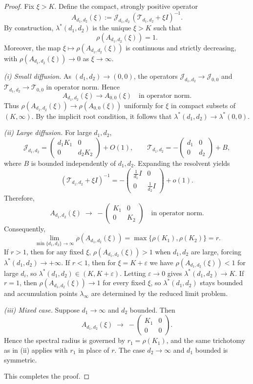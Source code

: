 \documentclass[a4paper,11pt]{amsart}
\theoremstyle{definition}
\let\0=\emptyset
\numberwithin{equation}{section}
\theoremstyle{definition}
\let\0=\emptyset
\begin{document}
\begin{proof}
Fix $\xi>K$. Define the compact, strongly positive operator
\[
A_{d_1,d_2}(\xi):=\mathscr{J}_{d_1,d_2}\,(\mathscr{T}_{d_1,d_2}+\xi I)^{-1}.
\]
By construction, $\lambda^\ast(d_1,d_2)$ is the unique $\xi>K$ such that
\[
\rho(A_{d_1,d_2}(\xi))=1.
\]
Moreover, the map $\xi\mapsto \rho(A_{d_1,d_2}(\xi))$ is continuous and strictly decreasing, with
\(\rho(A_{d_1,d_2}(\xi))\to 0\) as $\xi\to\infty$.

\smallskip\noindent
\emph{(i) Small diffusion.}
As $(d_1,d_2)\to(0,0)$, the operators $\mathscr{J}_{d_1,d_2}\to\mathscr{J}_{0,0}$ and
$\mathscr{T}_{d_1,d_2}\to\mathscr{T}_{0,0}$ in operator norm. Hence
\[
A_{d_1,d_2}(\xi)\to A_{0,0}(\xi) \quad \text{in operator norm.}
\]
Thus $\rho(A_{d_1,d_2}(\xi))\to\rho(A_{0,0}(\xi))$ uniformly for $\xi$ in compact subsets of $(K,\infty)$.
By the implicit root condition, it follows that
\(\lambda^\ast(d_1,d_2)\to\lambda^\ast(0,0)\).

\smallskip\noindent
\emph{(ii) Large diffusion.}
For large $d_1,d_2$,
\[
\mathscr{J}_{d_1,d_2}=\begin{pmatrix}d_1 K_1&0\\0&d_2 K_2\end{pmatrix}+O(1),
\qquad
\mathscr{T}_{d_1,d_2}=-\begin{pmatrix}d_1&0\\0&d_2\end{pmatrix}+B,
\]
where $B$ is bounded independently of $d_1,d_2$. Expanding the resolvent yields
\[
(\mathscr{T}_{d_1,d_2}+\xi I)^{-1}
= -\begin{pmatrix}\tfrac{1}{d_1}I & 0\\ 0 & \tfrac{1}{d_2}I\end{pmatrix}+o(1).
\]
Therefore,
\[
A_{d_1,d_2}(\xi)\;\longrightarrow\; -\begin{pmatrix}K_1&0\\0&K_2\end{pmatrix}
\quad\text{in operator norm.}
\]
Consequently,
\[
\lim_{\min\{d_1,d_2\}\to\infty}\rho(A_{d_1,d_2}(\xi))=\max\{\rho(K_1),\rho(K_2)\}=r.
\]
If $r>1$, then for any fixed $\xi$, $\rho(A_{d_1,d_2}(\xi))>1$ when $d_1,d_2$ are large, forcing
$\lambda^\ast(d_1,d_2)\to+\infty$.
If $r<1$, then for $\xi=K+\varepsilon$ we have $\rho(A_{d_1,d_2}(\xi))<1$ for large $d_i$, so
$\lambda^\ast(d_1,d_2)\in(K,K+\varepsilon)$. Letting $\varepsilon\to0$ gives $\lambda^\ast(d_1,d_2)\to K$.
If $r=1$, then $\rho(A_{d_1,d_2}(\xi))\to 1$ for every fixed $\xi$, so $\lambda^\ast(d_1,d_2)$ stays bounded
and accumulation points $\lambda_\infty$ are determined by the reduced limit problem.

\smallskip\noindent
\emph{(iii) Mixed case.}
Suppose $d_1\to\infty$ and $d_2$ bounded. Then
\[
A_{d_1,d_2}(\xi)\;\longrightarrow\; -\begin{pmatrix}K_1&0\\0&0\end{pmatrix}.
\]
Hence the spectral radius is governed by $r_1=\rho(K_1)$, and the same trichotomy as in (ii) applies with $r_1$ in place of $r$.
The case $d_2\to\infty$ and $d_1$ bounded is symmetric.

This completes the proof.
\end{proof}
\end{document}
